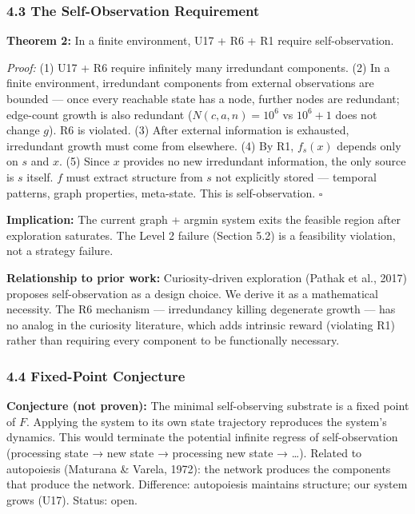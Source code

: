 \documentclass[
  11pt,
]{article}
\begin{document}
\subsubsection{4.3 The Self-Observation
Requirement}\label{the-self-observation-requirement}

\textbf{Theorem 2:} In a finite environment, U17 + R6 + R1 require
self-observation.

\emph{Proof:} (1) U17 + R6 require infinitely many irredundant
components. (2) In a finite environment, irredundant components from
external observations are bounded --- once every reachable state has a
node, further nodes are redundant; edge-count growth is also redundant
(\(N(c,a,n) = 10^6\) vs \(10^6+1\) does not change \(g\)). R6 is
violated. (3) After external information is exhausted, irredundant
growth must come from elsewhere. (4) By R1, \(f_s(x)\) depends only on
\(s\) and \(x\). (5) Since \(x\) provides no new irredundant
information, the only source is \(s\) itself. \(f\) must extract
structure from \(s\) not explicitly stored --- temporal patterns, graph
properties, meta-state. This is self-observation. \(\square\)

\textbf{Implication:} The current graph + argmin system exits the
feasible region after exploration saturates. The Level 2 failure
(Section 5.2) is a feasibility violation, not a strategy failure.

\textbf{Relationship to prior work:} Curiosity-driven exploration
(Pathak et al., 2017) proposes self-observation as a design choice. We
derive it as a mathematical necessity. The R6 mechanism --- irredundancy
killing degenerate growth --- has no analog in the curiosity literature,
which adds intrinsic reward (violating R1) rather than requiring every
component to be functionally necessary.

\subsubsection{4.4 Fixed-Point Conjecture}\label{fixed-point-conjecture}

\textbf{Conjecture (not proven):} The minimal self-observing substrate
is a fixed point of \(F\). Applying the system to its own state
trajectory reproduces the system's dynamics. This would terminate the
potential infinite regress of self-observation (processing state → new
state → processing new state → \ldots). Related to autopoiesis (Maturana
\& Varela, 1972): the network produces the components that produce the
network. Difference: autopoiesis maintains structure; our system grows
(U17). Status: open.
\end{document}
